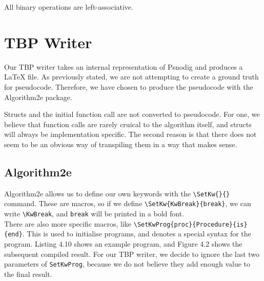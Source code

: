 All binary operations are left-associative.

\section{TBP Writer}

Our TBP writer takes an internal representation of Psnodig and produces a LaTeX file. As previously stated, we are not attempting to create a ground truth for pseudocode. Therefore, we have chosen to produce the pseudocode with the Algorithm2e package. \hfill \\


Structs and the initial function call are not converted to pseudocode. For one, we believe that function calls are rarely cruical to the algorithm itself, and structs will always be implementation specific. The second reason is that there does not seem to be an obvious way of transpiling them in a way that makes sense.

\subsection{Algorithm2e}


Algorithm2e allows us to define our own keywords with the \texttt{\textbackslash SetKw\{\}\{\}} command. These are macros, so if we define \texttt{\textbackslash SetKw\{KwBreak\}\{break\}}, we can write \texttt{\textbackslash KwBreak}, and \texttt{break} will be printed in a bold font. \hfill \\

There are also more specific macros, like \texttt{\textbackslash SetKwProg\{proc\}\{Procedure\}\{is\}\\\{end\}}. This is used to initialise programs, and denotes a special syntax for the program. Listing 4.10 shows an example program, and Figure 4.2 shows the subsequent compiled result. For our TBP writer, we decide to ignore the last two parameters of \texttt{SetKwProg}, because we do not believe they add enough value to the final result. \hfill \\

